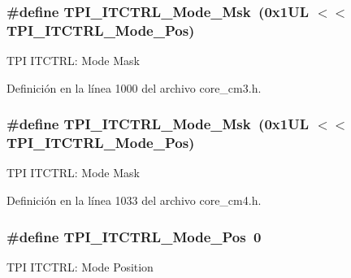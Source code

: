 \subsubsection[{\texorpdfstring{T\+P\+I\+\_\+\+I\+T\+C\+T\+R\+L\+\_\+\+Mode\+\_\+\+Msk}{TPI_ITCTRL_Mode_Msk}}]{\setlength{\rightskip}{0pt plus 5cm}\#define T\+P\+I\+\_\+\+I\+T\+C\+T\+R\+L\+\_\+\+Mode\+\_\+\+Msk~(0x1\+U\+L $<$$<$ T\+P\+I\+\_\+\+I\+T\+C\+T\+R\+L\+\_\+\+Mode\+\_\+\+Pos)}\hypertarget{group___c_m_s_i_s___t_p_i_gad6f87550b468ad0920d5f405bfd3f017}{}\label{group___c_m_s_i_s___t_p_i_gad6f87550b468ad0920d5f405bfd3f017}
T\+PI I\+T\+C\+T\+RL\+: Mode Mask 

Definición en la línea 1000 del archivo core\+\_\+cm3.\+h.

\subsubsection[{\texorpdfstring{T\+P\+I\+\_\+\+I\+T\+C\+T\+R\+L\+\_\+\+Mode\+\_\+\+Msk}{TPI_ITCTRL_Mode_Msk}}]{\setlength{\rightskip}{0pt plus 5cm}\#define T\+P\+I\+\_\+\+I\+T\+C\+T\+R\+L\+\_\+\+Mode\+\_\+\+Msk~(0x1\+U\+L $<$$<$ T\+P\+I\+\_\+\+I\+T\+C\+T\+R\+L\+\_\+\+Mode\+\_\+\+Pos)}\hypertarget{group___c_m_s_i_s___t_p_i_gad6f87550b468ad0920d5f405bfd3f017}{}\label{group___c_m_s_i_s___t_p_i_gad6f87550b468ad0920d5f405bfd3f017}
T\+PI I\+T\+C\+T\+RL\+: Mode Mask 

Definición en la línea 1033 del archivo core\+\_\+cm4.\+h.

\subsubsection[{\texorpdfstring{T\+P\+I\+\_\+\+I\+T\+C\+T\+R\+L\+\_\+\+Mode\+\_\+\+Pos}{TPI_ITCTRL_Mode_Pos}}]{\setlength{\rightskip}{0pt plus 5cm}\#define T\+P\+I\+\_\+\+I\+T\+C\+T\+R\+L\+\_\+\+Mode\+\_\+\+Pos~0}\hypertarget{group___c_m_s_i_s___t_p_i_gaa847adb71a1bc811d2e3190528f495f0}{}\label{group___c_m_s_i_s___t_p_i_gaa847adb71a1bc811d2e3190528f495f0}
T\+PI I\+T\+C\+T\+RL\+: Mode Position 

